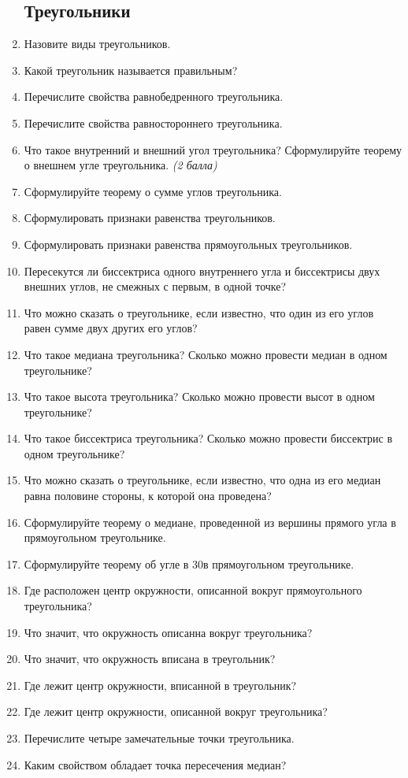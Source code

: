 \documentclass[12pt, a4paper]{article}
\begin{document}
\begin{enumerate}
	\subsection{Треугольники}
	\item Назовите виды треугольников.
	\item Какой треугольник называется правильным?
	\item Перечислите свойства равнобедренного треугольника.
	\item Перечислите свойства равностороннего треугольника.
	\item Что такое внутренний и внешний угол треугольника? Сформулируйте теорему о внешнем угле треугольника. \textit{(2 балла)}
	\item Сформулируйте теорему о сумме углов треугольника.
	\item Сформулировать признаки равенства треугольников.
	\item Сформулировать признаки равенства прямоугольных треугольников.
	\item Пересекутся ли биссектриса одного внутреннего угла и биссектрисы двух внешних углов, не смежных с первым, в одной точке?
	\item Что можно сказать о треугольнике, если известно, что один из его углов равен сумме двух других его углов?
	\item Что такое медиана треугольника? Сколько можно провести медиан в одном треугольнике?
	\item Что такое высота треугольника? Сколько можно провести высот в одном треугольнике?
	\item Что такое биссектриса треугольника? Сколько можно провести биссектрис в одном треугольнике?
	\item Что можно сказать о треугольнике, если известно, что одна из его медиан равна половине стороны, к которой она проведена?
	\item Сформулируйте теорему о медиане, проведенной из вершины прямого угла в прямоугольном треугольнике.
	\item Сформулируйте теорему об угле в 30\degree в прямоугольном треугольнике.
	\item Где расположен центр окружности, описанной вокруг прямоугольного треугольника?
	\item Что значит, что окружность описанна вокруг треугольника?
	\item Что значит, что окружность вписана в треугольник?
	\item Где лежит центр окружности, вписанной в треугольник?
	\item Где лежит центр окружности, описанной вокруг треугольника?
	\item Перечислите четыре замечательные точки треугольника.
	\item Каким свойством обладает точка пересечения медиан?

\end{enumerate}
\end{document}
